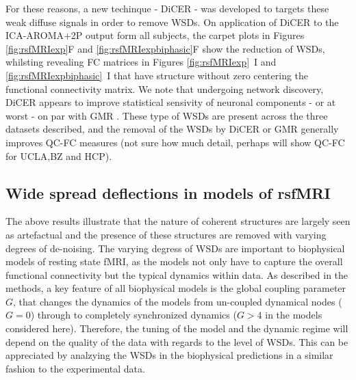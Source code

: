 \documentclass[oneside]{zHenriquesLab-StyleBioRxiv}
\begin{document}
For these reasons, a new techinque - DiCER - was developed to targets these weak diffuse signals \cite{aquino2019identifying} in order to remove WSDs. On application of DiCER to the ICA-AROMA+2P output form all subjects, the carpet plots in Figures \ref{fig:rsfMRIexp}F and \ref{fig:rsfMRIexpbiphasic}F show the reduction of WSDs, whilsting revealing FC matrices in Figures \ref{fig:rsfMRIexp}~I and \ref{fig:rsfMRIexpbiphasic}~I that have structure without zero centering the functional connectivity matrix. We note that undergoing network discovery, DiCER appears to improve statistical sensivity of neuronal components - or at worst - on par with GMR \cite{aquino2019identifying}. These type of WSDs are present across the three datasets described, and the removal of the WSDs by DiCER or GMR generally improves QC-FC measures (not sure how much detail, perhaps will show QC-FC for UCLA,BZ and HCP).

\subsection*{Wide spread deflections in models of rsfMRI}

The above results illustrate that the nature of coherent structures are largely seen as artefactual and the presence of these structures are removed with varying degrees of de-noising. The varying degress of WSDs are important to biophysical models of resting state fMRI, as the models not only have to capture the overall functional connectivity but the typical dynamics within data. As described in the methods, a key feature of all biophysical models is the global coupling parameter $G$, that changes the dynamics of the models from un-coupled dynamical nodes ($G=0$) through to completely synchronized dynamics ($G>4$ in the models considered here). Therefore, the tuning of the model and the dynamic regime will depend on the quality of the data with regards to the level of WSDs. This can be appreciated by analzying the WSDs in the biophysical predictions in a similar fashion to the experimental data.
\end{document}
